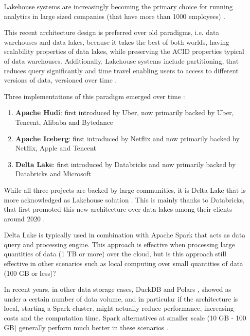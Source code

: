 Lakehouse systems are increasingly becoming the primary choice for running analytics in large sized  companies (that have more than 1000 employees) \cite{StateDataLakehouse2024}. 

This recent architecture design \cite{lakehouse2021} is preferred over old paradigms, i.e. data warehouses and data lakes, because it takes the best of both worlds, having scalability properties of data lakes, while preserving the \gls{ACID} properties typical of data warehouses. Additionally, Lakehouse systems include partitioning, that reduces query significantly and time travel enabling users to access to different versions of data, versioned over time \cite{crociDataLakehouseHype2022}.

Three implementations of this paradigm emerged over time \cite{ApacheHudiVs}: 
\begin{enumerate}
    \item \textbf{Apache Hudi}: first introduced by Uber, now primarily backed by Uber, Tencent, Alibaba and Bytedance
    \item \textbf{Apache Iceberg}: first introduced by Netflix and now primarily backed by Netflix, Apple and Tencent
    \item \textbf{Delta Lake}: first introduced by Databricks and now primarily backed by Databricks and Microsoft
\end{enumerate}

While all three projects are backed by large communities, it is Delta Lake that is more acknowledged as Lakehouse solution \cite{ApacheHudiVs}. This is mainly thanks to Databricks, that first promoted this new architecture over data lakes among their clients around 2020 \cite{armbrustDeltaLakeHighperformance2020}.

Delta Lake is typically used in combination with Apache Spark \cite{zahariaApacheSparkUnified2016} that acts as data query and processing engine. This approach is effective when processing large quantities of data (1 TB or more) over the cloud, but is this approach still effective in other scenarios such as local computing over small quantities of data (100 GB or less)?

In recent years, in other data storage cases, DuckDB \cite{raasveldtDuckDBEmbeddableAnalytical2019} and Polars \cite{vinkWroteOneFastest2021}, showed as under a certain number of data volume, and in particular if the architecture is local, starting a Spark cluster, might actually reduce performance, increasing costs and the computation time. Spark alternatives at smaller scale (10 GB - 100 GB) generally perform much better in these scenarios \cite{BenchmarkResultsSpark,ebergenUpdatesH2OAi2023}.

